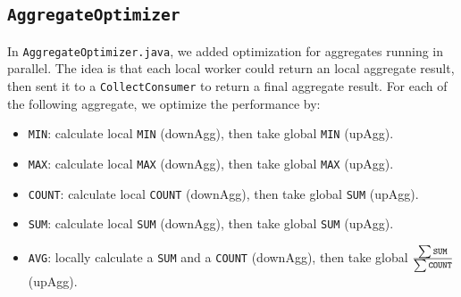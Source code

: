 \documentclass[12pt]{myland}
\def\<#1>{\texttt{#1}}
\begin{document}
    \subsection{\<AggregateOptimizer>}
    In \<AggregateOptimizer.java>, we added optimization for aggregates running in parallel. The idea is that each local
    worker could return an local aggregate result, then sent it to a \<CollectConsumer> to return a final aggregate
    result. For each of the following aggregate, we optimize the performance by:
    \begin{itemize}
        \item \<MIN>: calculate local \<MIN> (downAgg), then take global \<MIN> (upAgg).
        \item \<MAX>: calculate local \<MAX> (downAgg), then take global \<MAX> (upAgg).
        \item \<COUNT>: calculate local \<COUNT> (downAgg), then take global \<SUM> (upAgg).
        \item \<SUM>: calculate local \<SUM> (downAgg), then take global \<SUM> (upAgg).
        \item \<AVG>: locally calculate a \<SUM> and a \<COUNT> (downAgg), then take global
            $\frac{\sum\text{\<SUM>}}{\sum\text{\<COUNT>}}$ (upAgg).
    \end{itemize}
\end{document}
